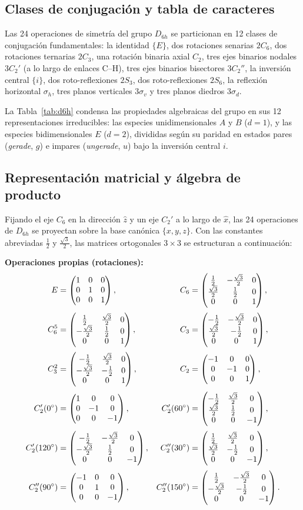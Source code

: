 \subsection{Clases de conjugación y tabla de caracteres}
Las 24 operaciones de simetría del grupo $D_{6h}$ se particionan en 12 clases de conjugación fundamentales: la identidad $\{E\}$, dos rotaciones senarias $2C_6$, dos rotaciones ternarias $2C_3$, una rotación binaria axial $C_2$, tres ejes binarios nodales $3C_2'$ (a lo largo de enlaces C--H), tres ejes binarios bisectores $3C_2''$, la inversión central $\{i\}$, dos roto-reflexiones $2S_3$, dos roto-reflexiones $2S_6$, la reflexión horizontal $\sigma_h$, tres planos verticales $3\sigma_v$ y tres planos diedros $3\sigma_d$.

La Tabla~\ref{tab:d6h} condensa las propiedades algebraicas del grupo en sus 12 representaciones irreducibles: las especies unidimensionales $A$ y $B$ ($d=1$), y las especies bidimensionales $E$ ($d=2$), divididas según su paridad en estados pares (\emph{gerade}, $g$) e impares (\emph{ungerade}, $u$) bajo la inversión central $i$.



\vspace{6pt}
\subsection{Representación matricial y álgebra de producto}
\vspace{2pt}

Fijando el eje $C_6$ en la dirección $\hat{z}$ y un eje $C_2'$ a lo largo de $\hat{x}$, las 24 operaciones de $D_{6h}$ se proyectan sobre la base canónica $\{x,y,z\}$. Con las constantes abreviadas $\frac{1}{2}$ y $\frac{\sqrt{3}}{2}$, las matrices ortogonales $3 \times 3$ se estructuran a continuación:

\begingroup
\scriptsize
\setlength{\arraycolsep}{1.5pt}
\noindent\textbf{Operaciones propias (rotaciones):}
\begin{align*}
E &= \begin{pmatrix}1&0&0\\0&1&0\\0&0&1\end{pmatrix}, &
C_6 &= \begin{pmatrix}\tfrac{1}{2}&-\tfrac{\sqrt{3}}{2}&0\\\tfrac{\sqrt{3}}{2}&\tfrac{1}{2}&0\\0&0&1\end{pmatrix}, \\[2pt]
C_6^{5} &= \begin{pmatrix}\tfrac{1}{2}&\tfrac{\sqrt{3}}{2}&0\\-\tfrac{\sqrt{3}}{2}&\tfrac{1}{2}&0\\0&0&1\end{pmatrix}, &
C_3 &= \begin{pmatrix}-\tfrac{1}{2}&-\tfrac{\sqrt{3}}{2}&0\\\tfrac{\sqrt{3}}{2}&-\tfrac{1}{2}&0\\0&0&1\end{pmatrix}, \\[2pt]
C_3^{2} &= \begin{pmatrix}-\tfrac{1}{2}&\tfrac{\sqrt{3}}{2}&0\\-\tfrac{\sqrt{3}}{2}&-\tfrac{1}{2}&0\\0&0&1\end{pmatrix}, &
C_2 &= \begin{pmatrix}-1&0&0\\0&-1&0\\0&0&1\end{pmatrix}, \\[2pt]
C_2'(0^\circ) &= \begin{pmatrix}1&0&0\\0&-1&0\\0&0&-1\end{pmatrix}, &
C_2'(60^\circ) &= \begin{pmatrix}-\tfrac{1}{2}&\tfrac{\sqrt{3}}{2}&0\\\tfrac{\sqrt{3}}{2}&\tfrac{1}{2}&0\\0&0&-1\end{pmatrix}, \\[2pt]
C_2'(120^\circ) &= \begin{pmatrix}-\tfrac{1}{2}&-\tfrac{\sqrt{3}}{2}&0\\-\tfrac{\sqrt{3}}{2}&\tfrac{1}{2}&0\\0&0&-1\end{pmatrix}, &
C_2''(30^\circ) &= \begin{pmatrix}\tfrac{1}{2}&\tfrac{\sqrt{3}}{2}&0\\\tfrac{\sqrt{3}}{2}&-\tfrac{1}{2}&0\\0&0&-1\end{pmatrix}, \\[2pt]
C_2''(90^\circ) &= \begin{pmatrix}-1&0&0\\0&1&0\\0&0&-1\end{pmatrix}, &
C_2''(150^\circ) &= \begin{pmatrix}\tfrac{1}{2}&-\tfrac{\sqrt{3}}{2}&0\\-\tfrac{\sqrt{3}}{2}&-\tfrac{1}{2}&0\\0&0&-1\end{pmatrix}.
\end{align*}

